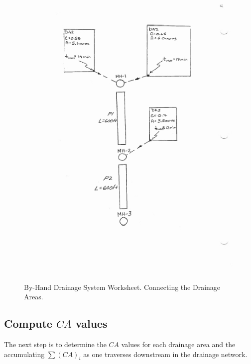 \documentclass[12pt]{article}
\begin{document}
\begin{enumerate}
\begin{figure}[ht!]
   \includegraphics[height=6in]{DrainageLayout4.jpg}
   \caption{By-Hand Drainage System Worksheet. Connecting the Drainage Areas.}
   \label{fig:DrainageLayout4} 
\end{figure}
\end{enumerate}

\subsection*{Compute $CA$ values}
The next step is to determine the $CA$ values for each drainage area and the accumulating $\sum (CA)_i$ as one traverses downstream in the drainage network.
\end{document}
